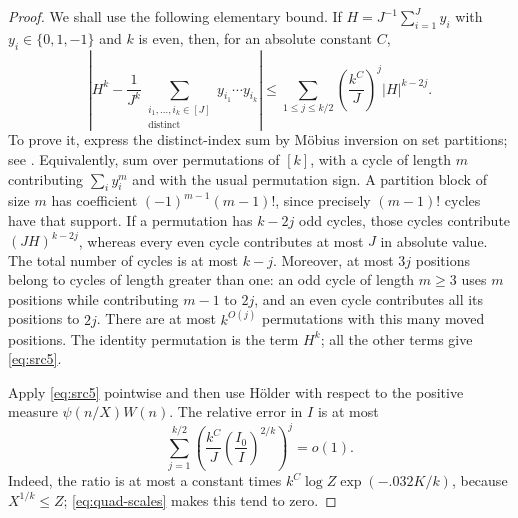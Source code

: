 \begin{proof}
We shall use the following elementary bound.  If
$H=J^{-1}\sum_{i=1}^J y_i$ with $y_i\in\{0,1,-1\}$ and $k$ is even,
then, for an absolute constant $C$,
\begin{equation}\label{eq:src5}
 \left|H^k-\frac1{J^k}
       \sum_{\substack{i_1,\ldots,i_k\in[J]\\\text{distinct}}}
                   y_{i_1}\cdots y_{i_k}\right|
 \leq\sum_{1\leq j\leq k/2}
             \left(\frac{k^C}{J}\right)^j|H|^{k-2j}.
\end{equation}
To prove it, express the distinct-index sum by M\"obius inversion on
set partitions; see \cite[Section~7, Example~1]{Rota1964}.
Equivalently, sum over permutations of $[k]$, with a
cycle of length $m$ contributing $\sum_i y_i^m$ and with the usual
permutation sign.  A partition block of size $m$ has coefficient
$(-1)^{m-1}(m-1)!$, since precisely $(m-1)!$ cycles have that support.
If a permutation has $k-2j$ odd cycles, those cycles contribute
$(JH)^{k-2j}$, whereas every even cycle contributes at most $J$ in
absolute value.  The total number of cycles is at most $k-j$.
Moreover, at most $3j$ positions belong to cycles of length greater
than one: an odd cycle of length $m\geq3$ uses $m$ positions while
contributing $m-1$ to $2j$, and an even cycle contributes all its
positions to $2j$.  There are at most $k^{O(j)}$ permutations with
this many moved positions.  The identity permutation is the term
$H^k$; all the other terms give \eqref{eq:src5}.

Apply \eqref{eq:src5} pointwise and then use H\"older with respect to
the positive measure $\psi(n/X)W(n)$.  The relative error in $I$ is
at most
\[
 \sum_{j=1}^{k/2}
 \left(\frac{k^C}{J}\left(\frac{I_0}{I}\right)^{2/k}\right)^j=o(1).
\]
Indeed, the ratio is at most a constant times
$k^C\log Z\exp(-.032K/k)$, because $X^{1/k}\leq Z$;
\eqref{eq:quad-scales} makes this tend to zero.


\end{proof}
